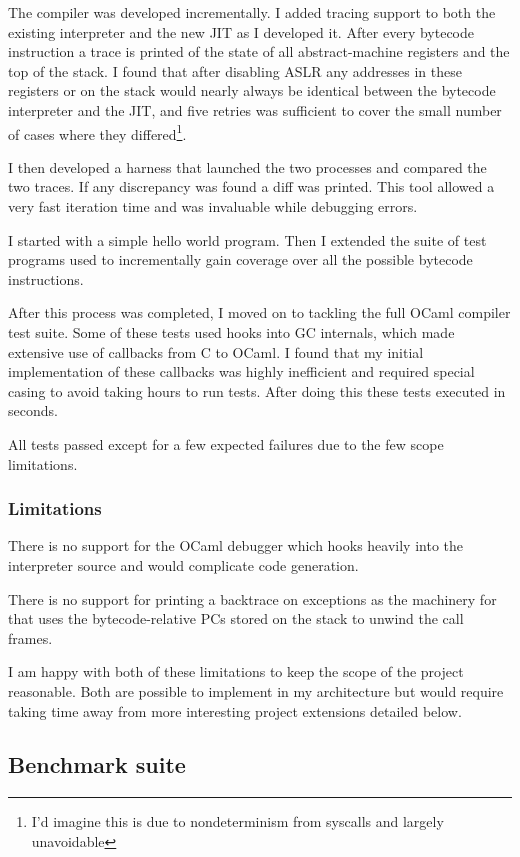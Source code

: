 \documentclass[12pt,a4paper, headings=standardclasses, parskip=on]{scrartcl}
\begin{document}
The compiler was developed incrementally. I added tracing support to both the
existing interpreter and the new JIT as I developed it. After every bytecode
instruction a trace is printed of the state of all abstract-machine
registers and the top of the stack. I found that after disabling ASLR any
addresses in these registers or on the stack would nearly always be identical
between the bytecode interpreter and the JIT, and five retries was sufficient to
cover the small number of cases where they differed\footnote{I'd imagine this
is due to nondeterminism from syscalls and largely unavoidable}.

I then developed a harness that launched the two processes and compared the
two traces. If any discrepancy was found a diff was printed. This tool allowed
a very fast iteration time and was invaluable while debugging errors.

I started with a simple hello world program. Then I extended the suite of
test programs used to incrementally gain coverage over all the possible
bytecode instructions.

After this process was completed, I moved on to tackling the full OCaml
compiler test suite. Some of these tests used hooks into GC internals, which
made extensive use of callbacks from C to OCaml. I found that my initial
implementation of these callbacks was highly inefficient and required special
casing to avoid taking hours to run tests. After doing this these tests
executed in seconds.

All tests passed except for a few expected failures due to the few scope
limitations.

\subsubsection*{Limitations}

There is no support for the OCaml debugger which hooks heavily into the
interpreter source and would complicate code generation.

There is no support for printing a backtrace on exceptions as the machinery
for that uses the bytecode-relative PCs stored on the stack to unwind the
call frames.

I am happy with both of these limitations to keep the scope of the project
reasonable. Both are possible to implement in my architecture but would
require taking time away from more interesting project extensions detailed
below.

\subsection{Benchmark suite}
\end{document}
